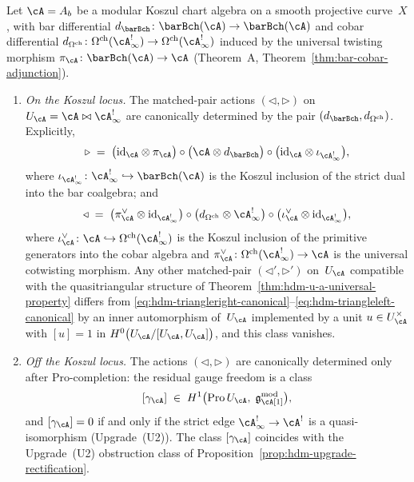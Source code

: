 \begin{theorem}
Let $\cA = A_b$ be a modular Koszul chart algebra on a smooth
projective curve~$X$, with bar differential
$d_{\barBch}\colon \barBch(\cA)\to \barBch(\cA)$ and cobar
differential $d_{\Omega^{\mathrm{ch}}}\colon
\Omega^{\mathrm{ch}}(\cA^!_\infty)\to
\Omega^{\mathrm{ch}}(\cA^!_\infty)$ induced by the universal twisting
morphism $\pi_\cA\colon \barBch(\cA)\to\cA$
\textup{(}Theorem~\textup{A},
Theorem~\textup{\ref{thm:bar-cobar-adjunction}}\textup{)}.
\begin{enumerate}[label=\textup{(\roman*)}]
\item \emph{On the Koszul locus.} The matched-pair actions
$(\triangleleft,\triangleright)$ on
$U_\cA=\cA\bowtie\cA^!_\infty$ are canonically determined by the
pair $(d_{\barBch},d_{\Omega^{\mathrm{ch}}})$. Explicitly,
\begin{equation}\label{eq:hdm-triangleright-canonical}
\triangleright\;=\;
\bigl(\mathrm{id}_{\cA}\otimes\pi_\cA\bigr)\circ
\bigl(\cA\otimes d_{\barBch}\bigr)\circ
\bigl(\mathrm{id}_{\cA}\otimes\iota_{\cA^!_\infty}\bigr),
\end{equation}
where $\iota_{\cA^!_\infty}\colon \cA^!_\infty\hookrightarrow
\barBch(\cA)$ is the Koszul inclusion of the strict dual into the
bar coalgebra; and
\begin{equation}\label{eq:hdm-triangleleft-canonical}
\triangleleft\;=\;
\bigl(\pi^\vee_\cA\otimes\mathrm{id}_{\cA^!_\infty}\bigr)\circ
\bigl(d_{\Omega^{\mathrm{ch}}}\otimes\cA^!_\infty\bigr)\circ
\bigl(\iota^\vee_\cA\otimes\mathrm{id}_{\cA^!_\infty}\bigr),
\end{equation}
where $\iota^\vee_\cA\colon \cA\hookrightarrow
\Omega^{\mathrm{ch}}(\cA^!_\infty)$ is the Koszul inclusion of the
primitive generators into the cobar algebra and
$\pi^\vee_\cA\colon \Omega^{\mathrm{ch}}(\cA^!_\infty)\to\cA$ is the
universal cotwisting morphism. Any other matched-pair
$(\triangleleft',\triangleright')$ on~$U_\cA$ compatible with the
quasitriangular structure of
Theorem~\textup{\ref{thm:hdm-u-a-universal-property}} differs from
\eqref{eq:hdm-triangleright-canonical}--\eqref{eq:hdm-triangleleft-canonical}
by an inner automorphism of~$U_\cA$ implemented by a unit
$u\in U_\cA^\times$ with $[u]=1$ in
$H^0\bigl(U_\cA/[U_\cA,U_\cA]\bigr)$, and this class
vanishes.
\item \emph{Off the Koszul locus.} The actions
$(\triangleleft,\triangleright)$ are canonically determined only
after $\mathrm{Pro}$-completion: the residual gauge freedom is a class
\begin{equation}\label{eq:hdm-matched-pair-gauge-class}
[\gamma_\cA]\;\in\;
H^1\bigl(\mathrm{Pro}\, U_\cA,\;\mathfrak g^{\mathrm{mod}}_\cA[1]\bigr),
\end{equation}
and $[\gamma_\cA]=0$ if and only if the strict edge
$\cA^!_\infty\to\cA^!$ is a quasi-isomorphism
\textup{(}Upgrade~\textup{(U2)}\textup{)}. The class
$[\gamma_\cA]$ coincides with the Upgrade~\textup{(U2)} obstruction
class of Proposition~\textup{\ref{prop:hdm-upgrade-rectification}}.
\end{enumerate}
\end{theorem}

